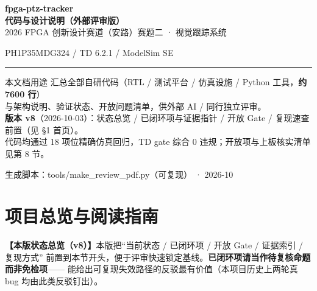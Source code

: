 \documentclass[10pt]{ctexart}
\begin{document}
\begin{titlepage}
\begin{tcolorbox}[enhanced, colback=deep, colframe=deep, sharp corners,
  boxrule=0pt, left=9mm, right=9mm, top=13mm, bottom=13mm,
  borderline west={1.4mm}{0pt}{accent}]
\raggedright
{\color{white}\Huge\bfseries fpga-ptz-tracker}\\[10pt]
{\color{rowtint}\Large\bfseries 代码与设计说明（外部评审版）}\\[12pt]
{\color{thinline}\large 2026 FPGA 创新设计赛道（安路）赛题二 · 视觉跟踪系统}
\end{tcolorbox}
\vspace{1.4cm}
\begin{center}
{\large PH1P35MDG324 / TD 6.2.1 / ModelSim SE}\\[10pt]
{\color{accent}\rule{0.32\textwidth}{0.9pt}}
\end{center}
\vspace{1.1cm}
\begin{notebox}{本文档用途}
\centering
{\small 汇总全部自研代码（RTL / 测试平台 / 仿真设施 / Python 工具，\textbf{约 7600 行}）\\
与架构说明、验证状态、开放问题清单，供外部 AI / 同行独立评审。\\
\textbf{版本 v8}（2026-10-03）：状态总览 / 已闭环项与证据指针 / 开放 Gate / 复现速查前置（见 \S1 首页）。\\
代码均通过 18 项位精确仿真回归，TD gate 综合 0 违规；开放项与上板核实清单见第 8 节。}
\end{notebox}
\vfill
{\small\color{black!55} 生成脚本：tools/make\_review\_pdf.py（可复现） · 2026-10}
\end{titlepage}
\tableofcontents
\newpage


\section{项目总览与阅读指南}

\textbf{【本版状态总览（v8）】}本版把“当前状态 / 已闭环项 / 开放 Gate / 证据索引 / 复现方式”
前置到本节开头，便于评审快速锁定基线。\textbf{已闭环项请当作待复核命题而非免检项}——
能给出可复现失效路径的反驳最有价值（本项目历史上两轮真 bug 均由此类反驳钉出）。
\end{document}
